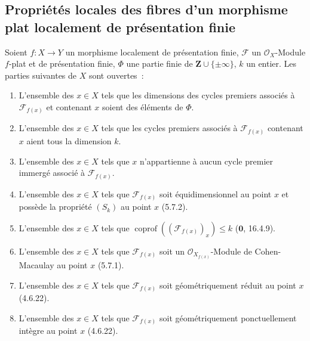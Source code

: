 \subsection{Propriétés locales des fibres d'un morphisme plat localement de
présentation finie}
\label{subsection:IV.12.1-fr}

\begin{theorem}[12.1.1]
Soient $f:X\to Y$ un morphisme localement de présentation finie, $\mathcal F$
un $\mathcal O_X$-Module $f$-plat et de présentation finie, $\Phi$ une partie
finie de $\mathbf Z\cup\{\pm\infty\}$, $k$ un entier. Les parties suivantes de
$X$ sont ouvertes~:
\begin{enumerate}[label=(\roman*)]
  \item L'ensemble des $x\in X$ tels que les dimensions des cycles premiers
  associés à $\mathcal F_{f(x)}$ et contenant $x$ soient des éléments de
  $\Phi$.
  \item L'ensemble des $x\in X$ tels que les cycles premiers associés à
  $\mathcal F_{f(x)}$ contenant $x$ aient tous la dimension $k$.
  \item L'ensemble des $x\in X$ tels que $x$ n'appartienne à aucun cycle
  premier immergé associé à $\mathcal F_{f(x)}$.
  \item L'ensemble des $x\in X$ tels que $\mathcal F_{f(x)}$ soit
  équidimensionnel au point $x$ et possède la propriété $(S_k)$ au point $x$
  (5.7.2).
  \item L'ensemble des $x\in X$ tels que
  $\operatorname{coprof}((\mathcal F_{f(x)})_x)\leq k$
  ($\mathbf 0$, 16.4.9).
  \item L'ensemble des $x\in X$ tels que $\mathcal F_{f(x)}$ soit un
  $\mathcal O_{X_{f(x)}}$-Module de Cohen-Macaulay au point $x$ (5.7.1).
  \item L'ensemble des $x\in X$ tels que $\mathcal F_{f(x)}$ soit
  géométriquement réduit au point $x$ (4.6.22).
  \item L'ensemble des $x\in X$ tels que $\mathcal F_{f(x)}$ soit
  géométriquement ponctuellement intègre au point $x$ (4.6.22).
\end{enumerate}
\end{theorem}

